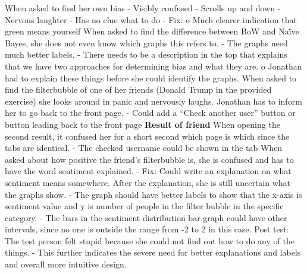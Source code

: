 When asked to find her own bias
-	Visibly confused
-	Scrolls up and down
-	Nervous laughter
-	Has no clue what to do
-	Fix:
	o	Much clearer indication that green means yourself
When asked to find the difference between BoW and Naïve Bayes, she does not even know which graphs this refers to.
-	The graphs need much better labels.
-	There needs to be a description in the top that explains that we have two approaches for determining bias and what they are.
	o	Jonathan had to explain these things before she could identify the graphs.
When asked to find the filterbubble of one of her friends (Donald Trump in the provided exercise) she looks around in panic and nervously laughs. Jonathan has to inform her to go back to the front page.
-	Could add a “Check another user” button or button leading back to the front page
\textbf{Result of friend}
When opening the second result, it confused her for a short second which page is which since the tabs are identical.
-	The checked username could be shown in the tab
When asked about how positive the friend’s filterbubble is, she is confused and has to have the word sentiment explained.
-	Fix: Could write an explanation on what sentiment means somewhere.
After the explanation, she is still uncertain what the graphs show.
-	The graph should have better labels to show that the x-axis is sentiment value and y is number of people in the filter bubble in the specific category.
-	The bars in the sentiment distribution bar graph could have other intervals, since no one is outside the range from -2 to 2 in this case.
Post test:
The test person felt stupid because she could not find out how to do any of the things.
-	This further indicates the severe need for better explanations and labels and overall more intuitive design. 

